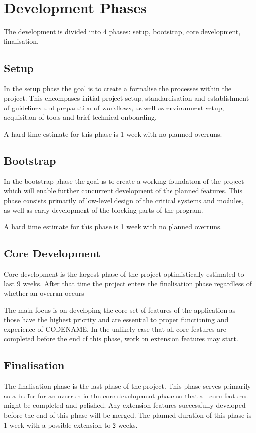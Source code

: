 \documentclass[12pt, a4paper]{article}
\begin{document}
\section{Development Phases}
The development is divided into 4 phases: setup, bootstrap, core development, finalisation.

\subsection{Setup}
In the setup phase the goal is to create a formalise the processes within the project. This
encompases initial project setup, standardisation and establishment of guidelines and preparation of
workflows, as well as environment setup, acquisition of tools and brief technical onboarding.

A hard time estimate for this phase is 1 week with no planned overruns.

\subsection{Bootstrap}
In the bootstrap phase the goal is to create a working foundation of the project which will enable
further concurrent development of the planned features. This phase consists primarily of low-level
design of the critical systems and modules, as well as early development of the blocking parts of
the program.

A hard time estimate for this phase is 1 week with no planned overruns.

\subsection{Core Development}
Core development is the largest phase of the project optimistically estimated to last 9 weeks. After
that time the project enters the finalisation phase regardless of whether an overrun occurs.

The main focus is on developing the core set of features of the application as those have the
highest priority and are essential to proper functioning and experience of CODENAME. In the unlikely
case that all core features are completed before the end of this phase, work on extension features
may start.

\subsection{Finalisation}
The finalisation phase is the last phase of the project. This phase serves primarily as a buffer for
an overrun in the core development phase so that all core features might be completed and polished.
Any extension features successfully developed before the end of this phase will be merged. The
planned duration of this phase is 1 week with a possible extension to 2 weeks.
\end{document}
